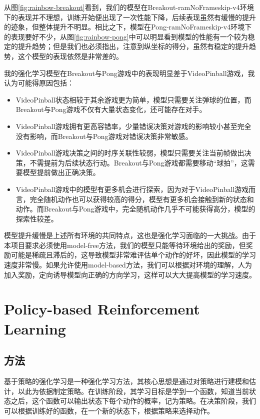 \documentclass{article}
\begin{document}
从图\ref{fig:rainbow-breakout}看到，我们的模型在Breakout-ramNoFrameskip-v4环境下的表现并不理想，训练开始便出现了一次性能下降，后续表现虽然有缓慢的提升的迹象，但整体提升不明显。相比之下，模型在Pong-ramNoFrameskip-v4环境下的表现要好不少，从图\ref{fig:rainbow-pong}中可以明显看到模型的性能有一个较为稳定的提升趋势；但是我们也必须指出，注意到纵坐标的得分，虽然有稳定的提升趋势，这个模型的表现依然是非常差的。

我的强化学习模型在Breakout与Pong游戏中的表现明显差于VideoPinball游戏，我认为可能得原因包括：

\begin{itemize}
	\item VideoPinball状态相较于其余游戏更为简单，模型只需要关注弹球的位置，而Breakout与Pong游戏不仅有大量状态变化，还可能存在对手。
	\item VideoPinball游戏拥有更高容错率，少量错误决策对游戏的影响较小甚至完全没有影响，而Breakout与Pong游戏对错误决策非常敏感。
	\item VideoPinball游戏决策之间的时序关联性较弱，模型只需要关注当前帧做出决策，不需提前为后续状态行动。Breakout与Pong游戏都需要移动“球拍”，这需要模型提前做出正确决策。
	\item VideoPinball游戏中的模型有更多机会进行探索，因为对于VideoPinball游戏而言，完全随机动作也可以获得较高的得分，模型有更多机会接触到新的状态和动作。而Breakout与Pong游戏中，完全随机动作几乎不可能获得高分，模型的探索性较差。
\end{itemize}

模型提升缓慢是上述所有环境的共同特点，这也是强化学习面临的一大挑战。由于本项目要求必须使用model-free方法，我们的模型只能等待环境给出的奖励，但奖励可能是稀疏且滞后的，这导致模型非常难评估单个动作的好坏，因此模型的学习速度非常慢。如果允许使用model-based方法，我们可以根据对环境的理解，人为加入奖励，定向诱导模型向正确的方向学习，这样可以大大提高模型的学习速度。

\section{Policy-based Reinforcement Learning}

\subsection{方法}
基于策略的强化学习是一种强化学习方法，其核心思想是通过对策略进行建模和估计，以此为依据制定策略。在训练阶段，其学习目标是学到一个函数，知道当前状态之后，这个函数可以输出状态下每个动作的概率，记为策略。在决策阶段，我们可以根据训练好的函数，在一个新的状态下，根据策略来选择动作。
\end{document}
